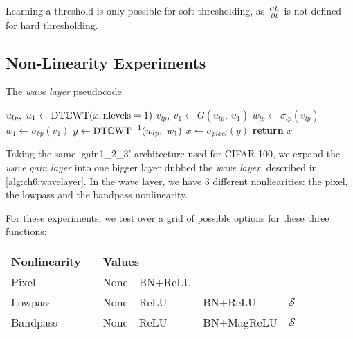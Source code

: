 Learning a threshold is only possible for soft thresholding, as $\frac{\partial L}{\partial t}$ is
not defined for hard thresholding. 

\subsection{Non-Linearity Experiments}
\begin{algorithm}[t]
  \caption{The \emph{wave layer} pseudocode}\label{alg:ch6:wavelayer}
\begin{algorithmic}[1]
  \State $u_{lp},\ u_{1} \gets \mathrm{DT}\mathbb{C}\mathrm{WT}(x, \mbox{nlevels}=1) $ 
  \State $v_{lp},\ v_{1} \gets G(u_{lp},\ u_{1}) $ 
  \State $w_{lp} \gets \sigma_{lp}(v_{lp})$ 
  \State $w_{1} \gets \sigma_{bp}(v_{1})$ 
  \State $y \gets \mathrm{DT}\mathbb{C}\mathrm{WT}^{-1}(w_{lp},\ w_{1})$
  \State $x \gets \sigma_{pixel}(y)$ 
  \State \textbf{return} $x$
\EndProcedure
\end{algorithmic}
\end{algorithm}
Taking the same `gain1\_2\_3' architecture used for CIFAR-100, we expand the
\emph{wave gain layer} into one bigger layer
dubbed the \emph{wave layer}, described in \autoref{alg:ch6:wavelayer}. In the wave
layer, we have 3 different nonliearities: the pixel, the lowpass 
and the bandpass nonlinearity.

For these experiments, we test over a grid of possible options for these three
functions:
\begin{table}[h!]
  \centering
\begin{tabular}{l l l l l l l}
  \toprule
  Nonlinearity & \hphantom{abc} & \multicolumn{4}{l}{Values} \\
  \midrule
  Pixel && None & BN+ReLU \\
  Lowpass && None & ReLU & BN+ReLU & $\mathcal{S}$ \\
  Bandpass && None & ReLU & BN+MagReLU & $\mathcal{S}$ 
  \\\bottomrule
\end{tabular}
\end{table}

